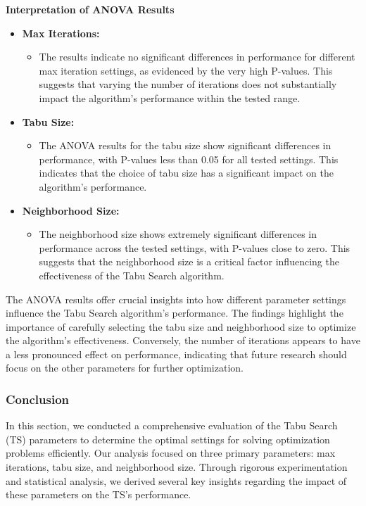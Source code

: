 \documentclass{article}
\begin{document}
    \textbf{Interpretation of ANOVA Results}

    \begin{itemize}
        \item \textbf{Max Iterations:}
        \begin{itemize}
            \item The results indicate no significant differences in performance for different max iteration settings, as evidenced by the very high P-values. This suggests that varying the number of iterations does not substantially impact the algorithm's performance within the tested range.
        \end{itemize}
        \item \textbf{Tabu Size:}
        \begin{itemize}
            \item The ANOVA results for the tabu size show significant differences in performance, with P-values less than 0.05 for all tested settings. This indicates that the choice of tabu size has a significant impact on the algorithm's performance.
        \end{itemize}
        \item \textbf{Neighborhood Size:}
        \begin{itemize}
            \item The neighborhood size shows extremely significant differences in performance across the tested settings, with P-values close to zero. This suggests that the neighborhood size is a critical factor influencing the effectiveness of the Tabu Search algorithm.
        \end{itemize}
    \end{itemize}

    The ANOVA results offer crucial insights into how different parameter settings influence the Tabu Search algorithm's performance. The findings highlight the importance of carefully selecting the tabu size and neighborhood size to optimize the algorithm's effectiveness. Conversely, the number of iterations appears to have a less pronounced effect on performance, indicating that future research should focus on the other parameters for further optimization.

    \subsubsection{Conclusion}

    In this section, we conducted a comprehensive evaluation of the Tabu Search (TS) parameters to determine the optimal settings for solving optimization problems efficiently. Our analysis focused on three primary parameters: max iterations, tabu size, and neighborhood size. Through rigorous experimentation and statistical analysis, we derived several key insights regarding the impact of these parameters on the TS’s performance.
\end{document}

